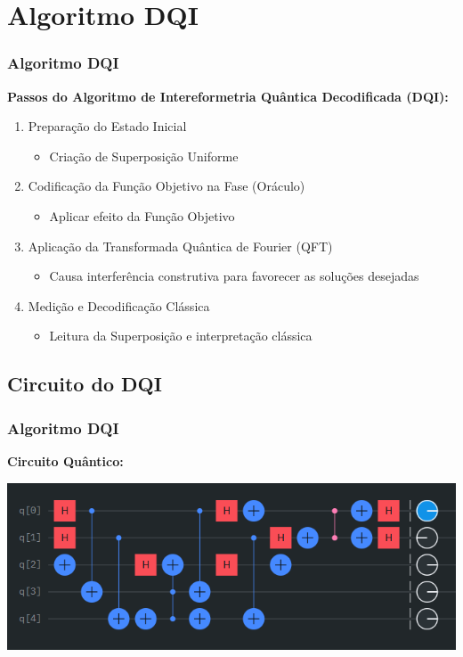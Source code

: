 \documentclass[aspectratio=169]{beamer}
\begin{document}
\section{Algoritmo DQI}
\begin{frame}
    \frametitle{Algoritmo DQI}

    \textbf{Passos do Algoritmo de Intereformetria Quântica Decodificada (DQI):}
    \vfill

    \begin{enumerate}
        \item Preparação do Estado Inicial
            \begin{itemize}
                \item Criação de Superposição Uniforme
            \end{itemize}
        \vfill
        \item Codificação da Função Objetivo na Fase (Oráculo)
            \begin{itemize}
                \item Aplicar efeito da Função Objetivo
            \end{itemize}
        \vfill
        \item Aplicação da Transformada Quântica de Fourier (QFT)
            \begin{itemize}
                \item Causa interferência construtiva para favorecer as soluções desejadas
            \end{itemize}
        \vfill
        \item Medição e Decodificação Clássica
            \begin{itemize}
                \item Leitura da Superposição e interpretação clássica
            \end{itemize}
    \end{enumerate}
\end{frame}

\subsection{Circuito do DQI}
\begin{frame}
  \frametitle{Algoritmo DQI}

  \textbf{Circuito Quântico:}

  \vspace{1cm}

  \includegraphics[scale=0.5]{circuito.png}
    
\end{frame}
\end{document}
